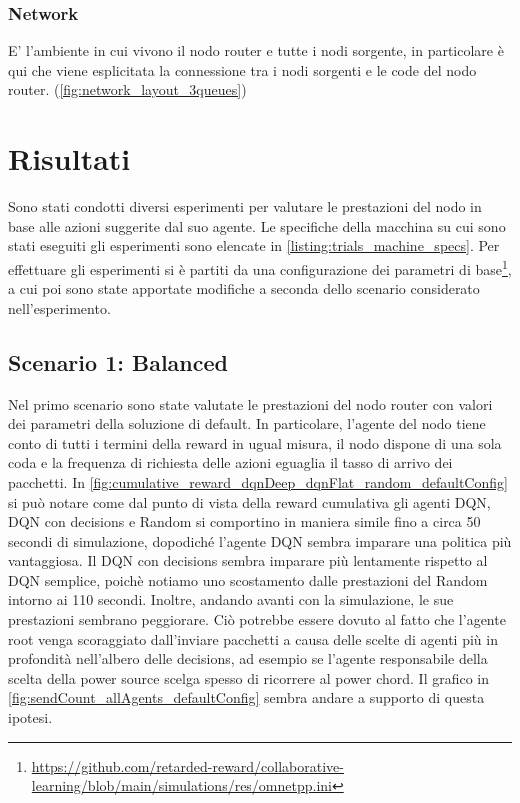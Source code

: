 \documentclass[conference]{IEEEtran}
\begin{document}
\subsubsection{Network}
E' l'ambiente in cui vivono il nodo router e tutte i nodi sorgente, in particolare è qui che viene esplicitata la connessione tra i nodi sorgenti e le code del nodo router. (\autoref{fig:network_layout_3queues}) 

\section{Risultati}
Sono stati condotti diversi esperimenti per valutare le prestazioni del nodo in base 
alle azioni suggerite dal suo agente. Le specifiche della macchina su cui sono stati
eseguiti gli esperimenti sono elencate in \autoref{listing:trials_machine_specs}.
Per effettuare gli esperimenti si è partiti da una configurazione dei parametri di 
base\footnote{\href{https://github.com/retarded-reward/collaborative-learning/blob/main/simulations/res/omnetpp.ini}{https://github.com/retarded-reward/collaborative-learning/blob/main/simulations/res/omnetpp.ini}}, a cui poi sono state apportate modifiche a seconda dello scenario considerato
nell'esperimento.

\subsection{Scenario 1: Balanced}
Nel primo scenario sono state valutate le prestazioni del nodo router con valori dei
parametri della soluzione di default. In particolare, l'agente del nodo tiene conto
di tutti i termini della reward in ugual misura, il nodo dispone di una sola coda
e la frequenza di richiesta delle azioni eguaglia il tasso di arrivo dei pacchetti. 
In \autoref{fig:cumulative_reward_dqnDeep_dqnFlat_random_defaultConfig} si può notare
come dal punto di vista della reward cumulativa gli agenti DQN, DQN con decisions e
Random si comportino in maniera simile fino a circa 50 secondi di simulazione, dopodiché
l'agente DQN sembra imparare una politica più vantaggiosa. Il DQN con decisions sembra
imparare più lentamente rispetto al DQN semplice, poichè notiamo uno scostamento dalle
prestazioni del Random intorno ai 110 secondi. Inoltre, andando avanti con la simulazione,
le sue prestazioni sembrano peggiorare. Ciò potrebbe essere dovuto al fatto che 
l'agente root venga scoraggiato dall'inviare pacchetti a causa delle scelte di agenti
più in profondità nell'albero delle decisions, ad esempio se l'agente responsabile della
scelta della power source scelga spesso di ricorrere al power chord. Il grafico in 
\autoref{fig:sendCount_allAgents_defaultConfig} sembra andare a supporto di questa
ipotesi.
\end{document}
